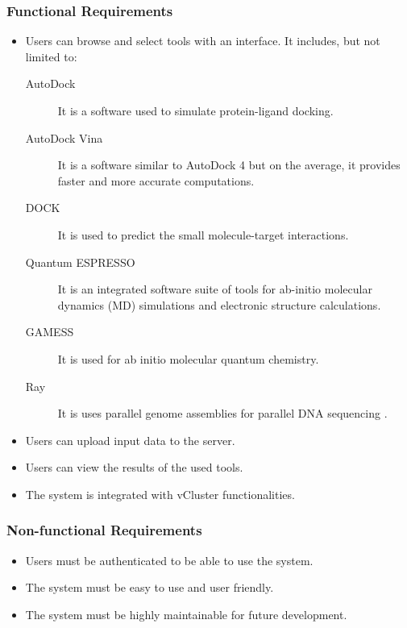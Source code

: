         \subsubsection{Functional Requirements}
        \begin{itemize}
          \item Users can browse and select tools with an interface. It includes, but not limited to:
          \begin{description}
          	\item[AutoDock] \hfill \break 
            It is a software used to simulate protein-ligand docking\cite{morris2009autodock4}.
            
            \item[AutoDock Vina] \hfill \break
            It is a software similar to AutoDock 4 but on the average, it provides faster and more accurate computations\cite{JCC:JCC21334}. 
            
            
            
            \item[DOCK] \hfill \break
            It is used to predict the small molecule-target interactions\cite{lang2009dock}.
            
            \item[Quantum ESPRESSO] \hfill \break
            It is an integrated software suite of tools for ab-initio molecular dynamics (MD) simulations and electronic structure calculations\cite{QE-2009}.

            \item[GAMESS] \hfill \break
            It is used for ab initio molecular quantum chemistry. \cite{1993gamess}
            
            \item[Ray] \hfill \break
            It is uses parallel genome assemblies for parallel DNA sequencing \cite{boisvert_ray_2012}.
          \end{description}
          \item Users can upload input data to the server.
          \item Users can view the results of the used tools.
          \item The system is integrated with vCluster functionalities.
        \end{itemize}
        \subsubsection{Non-functional Requirements}
        \begin{itemize}
          \item Users must be authenticated to be able to use the system.
          \item The system must be easy to use and user friendly.
          \item The system must be highly maintainable for future development.  
        \end{itemize}
	
